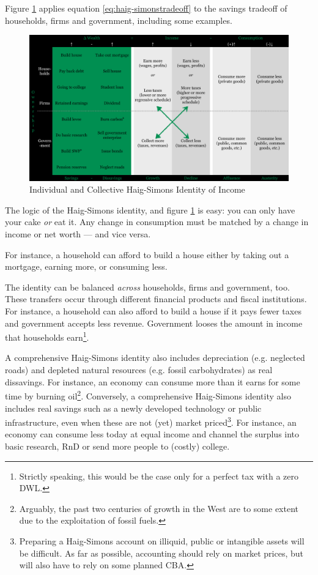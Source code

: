 Figure \ref{fig:haig-simons-individual-collective} applies equation \ref{eq:haig-simonstradeoff} to the savings tradeoff of households, firms and government, including some examples. 

\begin{figure}[htbp]
	\centering
	\includegraphics[width=1\linewidth]{./img/haig-simons-individual-collective}  
	\caption{Individual and Collective Haig-Simons Identity of Income}
	\label{fig:haig-simons-individual-collective} %
\end{figure}

The logic of the Haig-Simons identity, and figure \ref{fig:haig-simons-individual-collective} is easy: you can only have your cake \emph{or} eat it. Any change in consumption must be matched by a change in income or net worth --- and vice versa. 

For instance, a household can afford to build a house either by taking out a mortgage, earning more, or consuming less. 

The identity can be balanced \emph{across} households, firms and government, too. These transfers occur through different financial products and fiscal institutions. For instance, a household can also afford to build a house if it pays fewer taxes and government accepts less revenue. Government looses the amount in income that households earn\footnote{
	Strictly speaking, this would be the case only for a perfect tax with a zero \gls{DWL}.}. 

A comprehensive Haig-Simons identity also includes depreciation (e.g. neglected roads) and depleted natural resources (e.g. fossil carbohydrates) as real dissavings. For instance, an economy can consume more than it earns for some time by burning oil\footnote{
	Arguably, the past two centuries of growth in the West are to some extent due to the exploitation of fossil fuels.}. %
Conversely, a comprehensive Haig-Simons identity also includes real savings such as a newly developed technology or public infrastructure, even when these are not (yet) market priced\footnote{
	Preparing a Haig-Simons account on illiquid, public or intangible assets will be difficult. As far as possible, accounting should rely on market prices, but will also have to rely on  some planned \gls{CBA}.}. 
For instance, an economy can consume less today at equal income and channel the surplus into basic research, \gls{RnD} or send more people to (costly) college.


